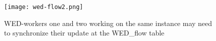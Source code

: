 \documentclass[conference]{IEEEtran}
\begin{document}
\begin{figure}[!t]
\centering
\texttt{[image: wed-flow2.png]}
\caption{WED-workers one and two working on the same instance may need to synchronize their update at the WED\_flow table}
\label{fig_wf}
\end{figure}


%
%



%
%
\end{document}
